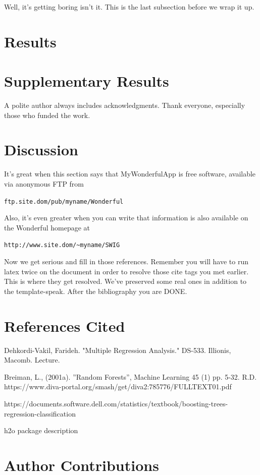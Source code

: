 \documentclass[letterpaper,twocolumn,10pt]{article}
\begin{document}
Well, it's getting boring isn't it.  This is the last subsection
before we wrap it up.


\section{Results}

\section{Supplementary Results}

A polite author always includes acknowledgments.  Thank everyone,
especially those who funded the work. 

\section{Discussion}

It's great when this section says that MyWonderfulApp is free software, 
available via anonymous FTP from

\begin{center}
{\tt ftp.site.dom/pub/myname/Wonderful}\\
\end{center}

Also, it's even greater when you can write that information is also 
available on the Wonderful homepage at 

\begin{center}
{\tt http://www.site.dom/\~{}myname/SWIG}
\end{center}

Now we get serious and fill in those references.  Remember you will
have to run latex twice on the document in order to resolve those
cite tags you met earlier.  This is where they get resolved.
We've preserved some real ones in addition to the template-speak.
After the bibliography you are DONE.

\section{References Cited}

Dehkordi-Vakil, Farideh. "Multiple Regression Analysis." DS-533. Illionis, Macomb. Lecture.

Breiman, L., (2001a). ”Random Forests”, Machine Learning 45 (1) pp. 5-32.
R.D. https://www.diva-portal.org/smash/get/diva2:785776/FULLTEXT01.pdf


https://documents.software.dell.com/statistics/textbook/boosting-trees-regression-classification

h2o package description


\section{Author Contributions}
\end{document}
